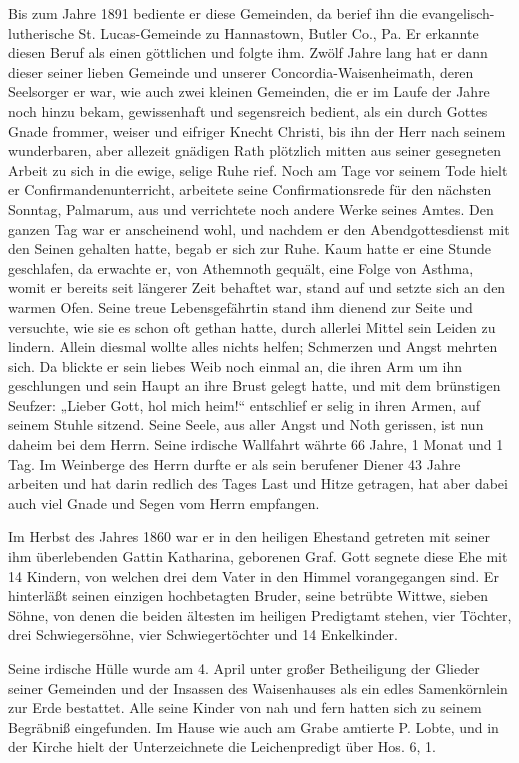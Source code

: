 Bis zum Jahre 1891 bediente er diese Gemeinden, da berief ihn die evangelisch-lutherische St. Lucas-Gemeinde zu Hannastown, Butler Co., Pa. Er erkannte diesen Beruf als einen göttlichen und folgte ihm. Zwölf Jahre lang hat er dann dieser seiner lieben Gemeinde und unserer Concordia-Waisenheimath, deren Seelsorger er war, wie auch zwei kleinen Gemeinden, die er im Laufe der Jahre noch hinzu bekam, gewissenhaft und segensreich bedient, als ein durch Gottes Gnade frommer, weiser und eifriger Knecht Christi, bis ihn der Herr nach seinem wunderbaren, aber allezeit gnädigen Rath plötzlich mitten aus seiner gesegneten Arbeit zu sich in die ewige, selige Ruhe rief. Noch am Tage vor seinem Tode hielt er Confirmandenunterricht, arbeitete seine Confirmationsrede für den nächsten Sonntag, Palmarum, aus und verrichtete noch andere Werke seines Amtes. Den ganzen Tag war er anscheinend wohl, und nachdem er den Abendgottesdienst mit den Seinen gehalten hatte, begab er sich zur Ruhe. Kaum hatte er eine Stunde geschlafen, da erwachte er, von Athemnoth gequält, eine Folge von Asthma, womit er bereits seit längerer Zeit behaftet war, stand auf und setzte sich an den warmen Ofen. Seine treue Lebensgefährtin stand ihm dienend zur Seite und versuchte, wie sie es schon oft gethan hatte, durch allerlei Mittel sein Leiden zu lindern. Allein diesmal wollte alles nichts helfen; Schmerzen und Angst mehrten sich. Da blickte er sein liebes Weib noch einmal an, die ihren Arm um ihn geschlungen und sein Haupt an ihre Brust gelegt hatte, und mit dem brünstigen Seufzer: „Lieber Gott, hol mich heim!“ entschlief er selig in ihren Armen, auf seinem Stuhle sitzend. Seine Seele, aus aller Angst und Noth gerissen, ist nun daheim bei dem Herrn. Seine irdische Wallfahrt währte 66 Jahre, 1 Monat und 1 Tag. Im Weinberge des Herrn durfte er als sein berufener Diener 43 Jahre arbeiten und hat darin redlich des Tages Last und Hitze getragen, hat aber dabei auch viel Gnade und Segen vom Herrn empfangen.

Im Herbst des Jahres 1860 war er in den heiligen Ehestand getreten mit seiner ihm überlebenden Gattin Katharina, geborenen Graf. Gott segnete diese Ehe mit 14 Kindern, von welchen drei dem Vater in den Himmel vorangegangen sind. Er hinterläßt seinen einzigen hochbetagten Bruder, seine betrübte Wittwe, sieben Söhne, von denen die beiden ältesten im heiligen Predigtamt stehen, vier Töchter, drei Schwiegersöhne, vier Schwiegertöchter und 14 Enkelkinder.

Seine irdische Hülle wurde am 4. April unter großer Betheiligung der Glieder seiner Gemeinden und der Insassen des Waisenhauses als ein edles Samenkörnlein zur Erde bestattet. Alle seine Kinder von nah und fern hatten sich zu seinem Begräbniß eingefunden. Im Hause wie auch am Grabe amtierte P. Lobte, und in der Kirche hielt der Unterzeichnete die Leichenpredigt über Hos. 6, 1.

